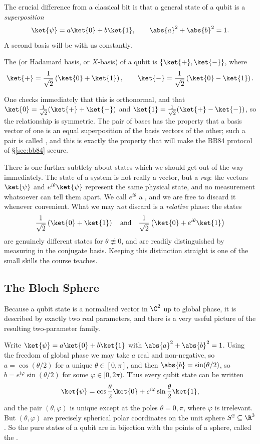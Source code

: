 The crucial difference from a classical bit is that a general state of a qubit is a \emph{superposition}
$$\ket{\psi} = a\ket{0} + b\ket{1}, \qquad \abs{a}^2 + \abs{b}^2 = 1.$$
A second basis will be with us constantly.

\begin{definition}
	The  (or Hadamard basis, or $X$-basis) of a qubit is $\{\ket{+}, \ket{-}\}$, where
	$$\ket{+} = \frac{1}{\sqrt{2}}\left(\ket{0} + \ket{1}\right), \qquad \ket{-} = \frac{1}{\sqrt{2}}\left(\ket{0} - \ket{1}\right).$$
\end{definition}

One checks immediately that this is orthonormal, and that $\ket{0} = \tfrac{1}{\sqrt2}(\ket{+} + \ket{-})$ and $\ket{1} = \tfrac{1}{\sqrt2}(\ket{+} - \ket{-})$, so the relationship is symmetric. The pair of bases has the property that a basis vector of one is an equal superposition of the basis vectors of the other; such a pair is called , and this is exactly the property that will make the BB84 protocol of \S\ref{sec:bb84} secure.

There is one further subtlety about states which we should get out of the way immediately. The state of a system is not really a vector, but a \emph{ray}: the vectors $\ket{\psi}$ and $e^{i\theta}\ket{\psi}$ represent the same physical state, and no measurement whatsoever can tell them apart. We call $e^{i\theta}$ a , and we are free to discard it whenever convenient. What we may \emph{not} discard is a \emph{relative} phase: the states
$$\frac{1}{\sqrt2}\left(\ket{0} + \ket{1}\right) \quad\text{and}\quad \frac{1}{\sqrt2}\left(\ket{0} + e^{i\theta}\ket{1}\right)$$
are genuinely different states for $\theta \not\equiv 0$, and are readily distinguished by measuring in the conjugate basis. Keeping this distinction straight is one of the small skills the course teaches.

\subsection{The Bloch Sphere}\label{sec:bloch}

Because a qubit state is a normalised vector in $\C^2$ up to global phase, it is described by exactly two real parameters, and there is a very useful picture of the resulting two-parameter family.

Write $\ket{\psi} = a \ket{0} + b\ket{1}$ with $\abs{a}^2 + \abs{b}^2 = 1$. Using the freedom of global phase we may take $a$ real and non-negative, so $a = \cos(\theta/2)$ for a unique $\theta \in [0,\pi]$, and then $\abs{b} = \sin(\theta/2)$, so $b = e^{i\varphi}\sin(\theta/2)$ for some $\varphi \in [0, 2\pi)$. Thus every qubit state can be written
$$\ket{\psi} = \cos\frac{\theta}{2}\ket{0} + e^{i\varphi}\sin\frac{\theta}{2}\ket{1},$$
and the pair $(\theta, \varphi)$ is unique except at the poles $\theta = 0, \pi$, where $\varphi$ is irrelevant. But $(\theta,\varphi)$ are precisely spherical polar coordinates on the unit sphere $S^2 \subseteq \R^3$. So the pure states of a qubit are in bijection with the points of a sphere, called the .


